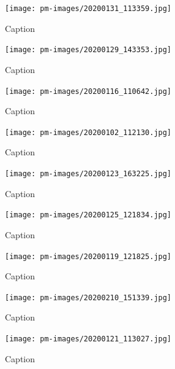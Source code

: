         \clearpage
        
\begin{figure}[]
\centering
\texttt{[image: pm-images/20200131\_113359.jpg]}
\caption{Caption}
\end{figure}

        \clearpage
        
\begin{figure}[]
\centering
\texttt{[image: pm-images/20200129\_143353.jpg]}
\caption{Caption}
\end{figure}

        \clearpage
        
\begin{figure}[]
\centering
\texttt{[image: pm-images/20200116\_110642.jpg]}
\caption{Caption}
\end{figure}

        \clearpage
        
\begin{figure}[]
\centering
\texttt{[image: pm-images/20200102\_112130.jpg]}
\caption{Caption}
\end{figure}

        \clearpage
        
\begin{figure}[]
\centering
\texttt{[image: pm-images/20200123\_163225.jpg]}
\caption{Caption}
\end{figure}

        \clearpage
        
\begin{figure}[]
\centering
\texttt{[image: pm-images/20200125\_121834.jpg]}
\caption{Caption}
\end{figure}

        \clearpage
        
\begin{figure}[]
\centering
\texttt{[image: pm-images/20200119\_121825.jpg]}
\caption{Caption}
\end{figure}

\begin{figure}[]
\centering
\texttt{[image: pm-images/20200210\_151339.jpg]}
\caption{Caption}
\end{figure}

        \clearpage
        
\begin{figure}[]
\centering
\texttt{[image: pm-images/20200121\_113027.jpg]}
\caption{Caption}
\end{figure}

